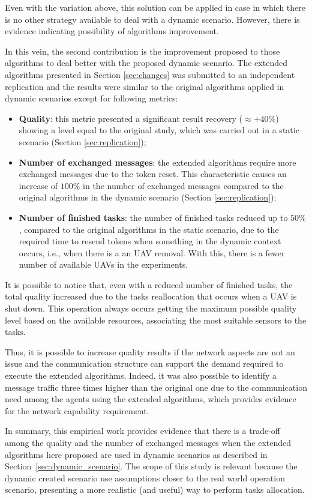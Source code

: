 Even with the variation above, this solution can be applied in case in which there is no other strategy available to deal with a dynamic scenario. However, there is evidence indicating possibility of algorithms improvement.

In this vein, the second contribution is the improvement proposed to those algorithms to deal better with the proposed dynamic scenario. The extended algorithms presented in Section \ref{sec:changes} was submitted to an independent replication and the results were similar to the original algorithms applied in dynamic scenarios except for following metrics:

\begin{itemize}
   \item \textbf{Quality}: this metric presented a significant result recovery ($\approx +40\%$) showing a level equal to the original study, which was carried out in a static scenario (Section \ref{sec:replication});
   \item \textbf{Number of exchanged messages}: the extended algorithms require more exchanged messages due to the token reset. This characteristic causes an increase of $100\%$ in the number of exchanged messages compared to the original algorithms in the dynamic scenario (Section \ref{sec:replication});
   \item \textbf{Number of finished tasks}: the number of finished tasks reduced up to $50\%$, compared to the original algorithms in the static scenario, due to the required time to resend tokens when something in the dynamic context occurs, i.e., when there is a an UAV removal. With this, there is a fewer number of available UAVs in the experiments.
\end{itemize}

It is possible to notice that, even with a reduced number of finished tasks, the total quality increased due to the tasks reallocation that occurs when a UAV is shut down. This operation always occurs getting the maximum possible quality level based on the available resources, associating the most suitable sensors to the tasks.

Thus, it is possible to increase quality results if the network aspects are not an issue and the communication structure can support the demand required to execute the extended algorithms. Indeed, it was also possible to identify a message traffic three times higher than the original one due to the communication need among the agents using the extended algorithms, which provides evidence for the network capability requirement.

In summary, this empirical work provides evidence that there is a trade-off among the quality and the number of exchanged messages when the extended algorithms here proposed are used in dynamic scenarios as described in Section~\ref{sec:dynamic_scenario}. The scope of this study is relevant because the dynamic created scenario use assumptions closer to the real world operation scenario, presenting a more realistic (and useful) way to perform tasks allocation.